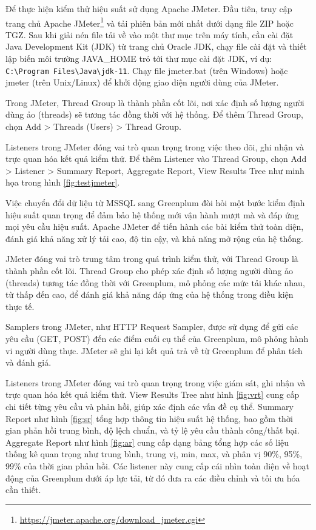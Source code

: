 \documentclass{article}[14pt]
\begin{document}
Để thực hiện kiểm thử hiệu suất sử dụng Apache JMeter. Đầu tiên, truy cập trang chủ Apache JMeter\footnote{\url{https://jmeter.apache.org/download_jmeter.cgi}} và tải phiên bản mới nhất dưới dạng file ZIP hoặc TGZ. Sau khi giải nén file tải về vào một thư mục trên máy tính, cần cài đặt Java Development Kit (JDK) từ trang chủ Oracle JDK, chạy file cài đặt và thiết lập biến môi trường JAVA\_HOME trỏ tới thư mục cài đặt JDK, ví dụ: \verb|C:\Program Files\Java\jdk-11|. Chạy file jmeter.bat (trên Windows) hoặc jmeter (trên Unix/Linux) để khởi động giao diện người dùng của JMeter.


Trong JMeter, Thread Group là thành phần cốt lõi, nơi xác định số lượng người dùng ảo (threads) sẽ tương tác đồng thời với hệ thống. Để thêm Thread Group, chọn Add > Threads (Users) > Thread Group.

Listeners trong JMeter đóng vai trò quan trọng trong việc theo dõi, ghi nhận và trực quan hóa kết quả kiểm thử. Để thêm Listener vào Thread Group, chọn Add > Listener > Summary Report, Aggregate Report, View Results Tree như minh họa trong hình \ref{fig:testjmeter}.

Việc chuyển đổi dữ liệu từ MSSQL sang Greenplum đòi hỏi một bước kiểm định hiệu suất quan trọng để đảm bảo hệ thống mới vận hành mượt mà và đáp ứng mọi yêu cầu hiệu suất. Apache JMeter để tiến hành các bài kiểm thử toàn diện, đánh giá khả năng xử lý tải cao, độ tin cậy, và khả năng mở rộng của hệ thống.

JMeter đóng vai trò trung tâm trong quá trình kiểm thử, với Thread Group là thành phần cốt lõi. Thread Group cho phép xác định số lượng người dùng ảo (threads) tương tác đồng thời với Greenplum, mô phỏng các mức tải khác nhau, từ thấp đến cao, để đánh giá khả năng đáp ứng của hệ thống trong điều kiện thực tế.

Samplers trong JMeter, như HTTP Request Sampler, được sử dụng để gửi các yêu cầu (GET, POST) đến các điểm cuối cụ thể của Greenplum, mô phỏng hành vi người dùng thực. JMeter sẽ ghi lại kết quả trả về từ Greenplum để phân tích và đánh giá.

Listeners trong JMeter đóng vai trò quan trọng trong việc giám sát, ghi nhận và trực quan hóa kết quả kiểm thử. View Results Tree như hình \ref{fig:vrt} cung cấp chi tiết từng yêu cầu và phản hồi, giúp xác định các vấn đề cụ thể. Summary Report như hình \ref{fig:sr} tổng hợp thông tin hiệu suất hệ thống, bao gồm thời gian phản hồi trung bình, độ lệch chuẩn, và tỷ lệ yêu cầu thành công/thất bại. Aggregate Report như hình \ref{fig:ar} cung cấp dạng bảng tổng hợp các số liệu thống kê quan trọng như trung bình, trung vị, min, max, và phân vị 90\%, 95\%, 99\% của thời gian phản hồi. Các listener này cung cấp cái nhìn toàn diện về hoạt động của Greenplum dưới áp lực tải, từ đó đưa ra các điều chỉnh và tối ưu hóa cần thiết.
\end{document}
